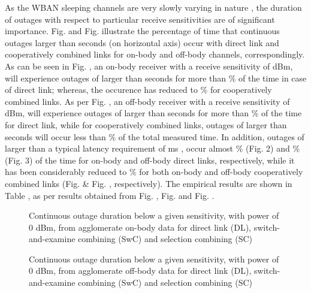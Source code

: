 \documentclass[twocolumn]{el-author}
\newlength \figwidth
\begin{document}
As the WBAN sleeping channels are very slowly varying in nature \cite{2}, the duration of outages with respect to particular receive sensitivities are of significant importance. Fig.  and Fig.  illustrate the percentage of time that continuous outages larger than  seconds (on horizontal axis) occur with direct link and cooperatively combined links for on-body and off-body channels, correspondingly. As can be seen in Fig. , an on-body receiver with a receive sensitivity of  dBm, will experience outages of larger than  seconds for more than \% of the time in case of direct link; whereas, the occurence has reduced to \% for cooperatively combined links. As per Fig. , an off-body receiver with a receive sensitivity of  dBm, will experience outages of larger than  seconds for more than \% of the time for direct link, while for cooperatively combined links, outages of larger than  seconds will occur less than \% of the total measured time.
In addition, outages of larger than a typical latency requirement of  ms \cite{10,11}, occur almost \% (Fig. 2) and \% (Fig. 3) of the time for on-body and off-body direct links, respectively, while it has been considerably reduced to \% for both on-body and off-body cooperatively combined links (Fig.  \& Fig. , respectively). The empirical results are shown in Table , as per results obtained from Fig. , Fig.  and Fig. .
\begin{figure}
\caption{Continuous outage duration below a given  sensitivity, with   power of 0 dBm, from agglomerate on-body data for direct link (DL), switch-and-examine combining (SwC) and selection combining (SC)}
\end{figure}

\begin{figure}
\caption{Continuous outage duration below a given  sensitivity, with   power of 0 dBm, from agglomerate off-body data for direct link (DL), switch-and-examine combining (SwC) and selection combining (SC)}
\end{figure}
\end{document}
